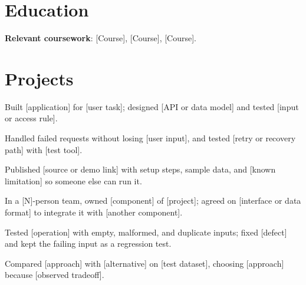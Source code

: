 \documentclass{resume}
\begin{document}

\section{Education}

\begin{jobduties}
  \item \textbf{Relevant coursework}: [Course], [Course], [Course].
\end{jobduties}

\section{Projects}

\begin{jobduties}
  \item Built [application] for [user task]; designed [API or data model] and tested [input or access rule].
  \item Handled failed requests without losing [user input], and tested [retry or recovery path] with [test tool].
  \item Published [source or demo link] with setup steps, sample data, and [known limitation] so someone else can run it.
\end{jobduties}

\begin{jobduties}
  \item In a [N]-person team, owned [component] of [project]; agreed on [interface or data format] to integrate it with [another component].
  \item Tested [operation] with empty, malformed, and duplicate inputs; fixed [defect] and kept the failing input as a regression test.
  \item Compared [approach] with [alternative] on [test dataset], choosing [approach] because [observed tradeoff].
\end{jobduties}
\end{document}
